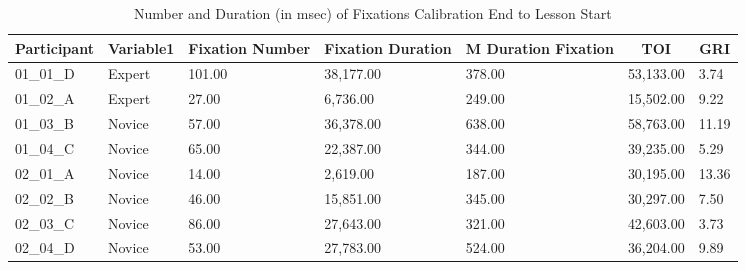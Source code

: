 \documentclass[
  english,
  man,floatsintext]{apa6}
\begin{document}
\begin{table}[h]

\begin{center}
\begin{threeparttable}

\caption{\label{tab:Calib end to lession start TOI}Number and Duration (in msec) of Fixations Calibration End to Lesson Start}

\scriptsize{

\begin{tabular}{lllllll}
\toprule
Participant & \multicolumn{1}{c}{Variable1} & \multicolumn{1}{c}{Fixation Number} & \multicolumn{1}{c}{Fixation Duration} & \multicolumn{1}{c}{M Duration Fixation} & \multicolumn{1}{c}{TOI} & \multicolumn{1}{c}{GRI}\\
\midrule
01\_01\_D & Expert & 101.00 & 38,177.00 & 378.00 & 53,133.00 & 3.74\\
01\_02\_A & Expert & 27.00 & 6,736.00 & 249.00 & 15,502.00 & 9.22\\
01\_03\_B & Novice & 57.00 & 36,378.00 & 638.00 & 58,763.00 & 11.19\\
01\_04\_C & Novice & 65.00 & 22,387.00 & 344.00 & 39,235.00 & 5.29\\
02\_01\_A & Novice & 14.00 & 2,619.00 & 187.00 & 30,195.00 & 13.36\\
02\_02\_B & Novice & 46.00 & 15,851.00 & 345.00 & 30,297.00 & 7.50\\
02\_03\_C & Novice & 86.00 & 27,643.00 & 321.00 & 42,603.00 & 3.73\\
02\_04\_D & Novice & 53.00 & 27,783.00 & 524.00 & 36,204.00 & 9.89\\
\bottomrule
\end{tabular}

}

\end{threeparttable}
\end{center}

\end{table}
\end{document}
